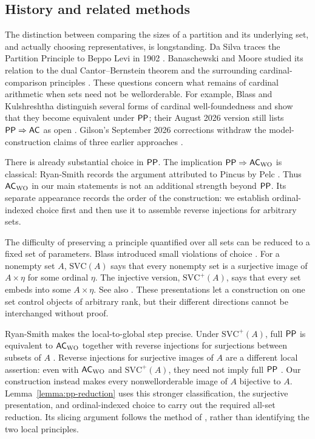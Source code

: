 \subsection{History and related methods}

The distinction between comparing the sizes of a partition and its
underlying set, and actually choosing representatives, is longstanding.
Da Silva traces the Partition Principle
to Beppo Levi in 1902 \cite[Section~2, p.~787]{daSilva2021}.
Banaschewski and Moore studied its relation to the dual
Cantor--Bernstein theorem and the surrounding cardinal-comparison
principles \cite{BanaschewskiMoore1990}. These questions concern what
remains of cardinal arithmetic when sets need not be wellorderable.
For example, Blass and Kulshreshtha distinguish several forms of
cardinal well-foundedness and show that they become equivalent under
$\mathsf{PP}$; their August 2026 version still lists $\mathsf{PP}\Rightarrow\mathsf{AC}$
as open \cite[Introduction and Section~9]{BlassKulshreshtha2026}.
Gilson's September 2026 corrections withdraw the model-construction
claims of three earlier approaches
\cite{GilsonSheafCorrection2026,GilsonExternalCorrection2026,GilsonIterationCorrection2026}.

There is already substantial choice in $\mathsf{PP}$. The implication
$\mathsf{PP}\Rightarrow\mathsf{AC}_{\mathrm{WO}}$ is classical: Ryan-Smith records the
argument attributed to Pincus by Pelc
\cite[Proposition~3.17, proof and footnote~4]{RyanSmith2025}.
Thus $\mathsf{AC}_{\mathrm{WO}}$ in our main statements is not an additional strength
beyond $\mathsf{PP}$. Its separate appearance records the order of the
construction: we establish ordinal-indexed choice first and then use
it to assemble reverse injections for arbitrary sets.

The difficulty of preserving a principle quantified over all sets
can be reduced to a fixed set of parameters. Blass introduced small
violations of choice \cite{Blass1979}. For a nonempty set $A$,
$\mathrm{SVC}(A)$ says that every nonempty set is a surjective image
of $A\times\eta$ for some ordinal $\eta$. The injective version,
$\mathrm{SVC}^{+}(A)$, says that every set embeds into some
$A\times\eta$. See also
\cite[Definition~3.13 and Theorem~3.14]{Usuba2021}.
These presentations let a construction on one set control objects
of arbitrary rank, but their different directions cannot be
interchanged without proof.

Ryan-Smith makes the local-to-global step precise. Under
$\mathrm{SVC}^{+}(A)$, full $\mathsf{PP}$ is equivalent to $\mathsf{AC}_{\mathrm{WO}}$
together with reverse injections for surjections between subsets of
$A$ \cite[Proposition~3.17]{RyanSmith2025}. Reverse injections for
surjective images of $A$ are a different local assertion: even with
$\mathsf{AC}_{\mathrm{WO}}$ and $\mathrm{SVC}^{+}(A)$, they need not imply full
$\mathsf{PP}$ \cite[Proposition~3.23]{RyanSmith2025}. Our construction
instead makes every nonwellorderable image of $A$ bijective to $A$.
Lemma~\ref{lemma:pp-reduction} uses this stronger classification,
the surjective presentation, and ordinal-indexed choice to carry out
the required all-set reduction. Its slicing argument follows the
method of \cite[Propositions~3.17 and~3.20]{RyanSmith2025}, rather
than identifying the two local principles.

